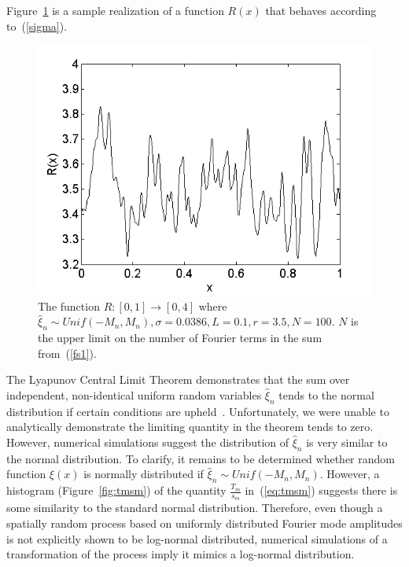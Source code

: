 Figure~\ref{fig:R} is a sample realization of a function $R(x)$ that
behaves according to~(\ref{sigma}).
\begin{figure}[!h]
\caption[The function $R(x)$]{The function $R:[0,1]\to [0,4]$ where
  $\hat{\xi}_n\sim Unif(-M_n,M_n),\sigma=0.0386, L=0.1, r=3.5,
  N=100$. $N$ is the upper limit on the number of Fourier terms in the
sum from~(\ref{fs1}).}\label{fig:R}
	\begin{center}
		\includegraphics[scale=0.6]{figs/xi.png}
	\end{center}
\end{figure}

The Lyapunov Central Limit Theorem demonstrates that
the sum over independent, non-identical uniform random variables
$\hat{\xi}_n$ tends to the normal distribution if certain conditions
are upheld~\cite{billingsley}. Unfortunately, we were unable to
analytically demonstrate the limiting quantity in the theorem tends to
zero. However, numerical simulations suggest the distribution of
$\hat{\xi}_n$ is very similar to the normal distribution. To clarify,
it remains to be determined whether random function $\xi(x)$ is
normally distributed if $\hat{\xi}_n \sim Unif(-M_n,M_n)$. However, a histogram (Figure~\ref{fig:tmsm}) of the quantity $\frac{T_m}{s_m}$ in~(\ref{eq:tmsm})
suggests there is some similarity to the standard normal
distribution. Therefore, even though a spatially random process based
on uniformly distributed Fourier mode amplitudes is not explicitly
shown to be log-normal distributed, numerical simulations of a
transformation of the process imply it mimics a log-normal distribution.

